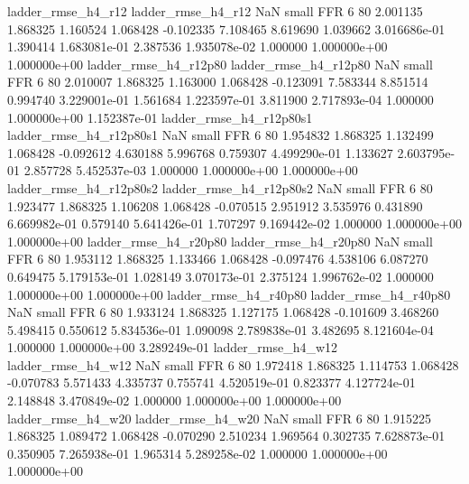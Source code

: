       ladder_rmse_h4_r12       ladder_rmse_h4_r12                   NaN      small      FFR                 6 80 2.001135       1.868325 1.160524       1.068428   -0.102335      7.108465      8.619690     1.039662   3.016686e-01  1.390414 1.683081e-01     2.387536   1.935078e-02            1.000000    1.000000e+00        1.000000e+00
   ladder_rmse_h4_r12p80    ladder_rmse_h4_r12p80                   NaN      small      FFR                 6 80 2.010007       1.868325 1.163000       1.068428   -0.123091      7.583344      8.851514     0.994740   3.229001e-01  1.561684 1.223597e-01     3.811900   2.717893e-04            1.000000    1.000000e+00        1.152387e-01
 ladder_rmse_h4_r12p80s1  ladder_rmse_h4_r12p80s1                   NaN      small      FFR                 6 80 1.954832       1.868325 1.132499       1.068428   -0.092612      4.630188      5.996768     0.759307   4.499290e-01  1.133627 2.603795e-01     2.857728   5.452537e-03            1.000000    1.000000e+00        1.000000e+00
 ladder_rmse_h4_r12p80s2  ladder_rmse_h4_r12p80s2                   NaN      small      FFR                 6 80 1.923477       1.868325 1.106208       1.068428   -0.070515      2.951912      3.535976     0.431890   6.669982e-01  0.579140 5.641426e-01     1.707297   9.169442e-02            1.000000    1.000000e+00        1.000000e+00
   ladder_rmse_h4_r20p80    ladder_rmse_h4_r20p80                   NaN      small      FFR                 6 80 1.953112       1.868325 1.133466       1.068428   -0.097476      4.538106      6.087270     0.649475   5.179153e-01  1.028149 3.070173e-01     2.375124   1.996762e-02            1.000000    1.000000e+00        1.000000e+00
   ladder_rmse_h4_r40p80    ladder_rmse_h4_r40p80                   NaN      small      FFR                 6 80 1.933124       1.868325 1.127175       1.068428   -0.101609      3.468260      5.498415     0.550612   5.834536e-01  1.090098 2.789838e-01     3.482695   8.121604e-04            1.000000    1.000000e+00        3.289249e-01
      ladder_rmse_h4_w12       ladder_rmse_h4_w12                   NaN      small      FFR                 6 80 1.972418       1.868325 1.114753       1.068428   -0.070783      5.571433      4.335737     0.755741   4.520519e-01  0.823377 4.127724e-01     2.148848   3.470849e-02            1.000000    1.000000e+00        1.000000e+00
      ladder_rmse_h4_w20       ladder_rmse_h4_w20                   NaN      small      FFR                 6 80 1.915225       1.868325 1.089472       1.068428   -0.070290      2.510234      1.969564     0.302735   7.628873e-01  0.350905 7.265938e-01     1.965314   5.289258e-02            1.000000    1.000000e+00        1.000000e+00
